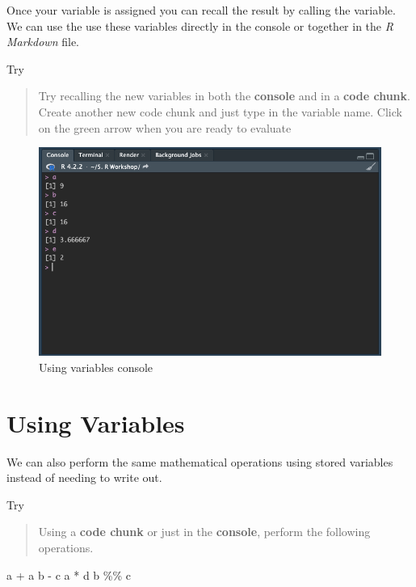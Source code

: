\documentclass[
]{book}
\newenvironment{Shaded}{\begin{snugshade}}{\end{snugshade}}
\newcommand{\NormalTok}[1]{#1}
\newcommand{\SpecialCharTok}[1]{\textcolor[rgb]{0.00,0.00,0.00}{#1}}
\begin{document}
Once your variable is assigned you can recall the result by calling the variable. We can use the use these variables directly in the console or together in the \emph{R Markdown} file.

Try

\begin{quote}
Try recalling the new variables in both the \textbf{console} and in a \textbf{code chunk}. Create another new code chunk and just type in the variable name. Click on the green arrow when you are ready to evaluate
\end{quote}

\begin{figure}
\includegraphics[width=10.12in]{images/3.4variablesconsole} \caption{Using variables console}\label{fig:unnamed-chunk-17}
\end{figure}

\hypertarget{using-variables}{%
\section{Using Variables}\label{using-variables}}

We can also perform the same mathematical operations using stored variables instead of needing to write out.

Try

\begin{quote}
Using a \textbf{code chunk} or just in the \textbf{console}, perform the following operations.
\end{quote}

\begin{Shaded}
\begin{Highlighting}[]
\NormalTok{a }\SpecialCharTok{+}\NormalTok{ a}
\NormalTok{b }\SpecialCharTok{{-}}\NormalTok{ c}
\NormalTok{a }\SpecialCharTok{*}\NormalTok{ d}
\NormalTok{b }\SpecialCharTok{\%\%}\NormalTok{ c}
\end{Highlighting}
\end{Shaded}
\end{document}
